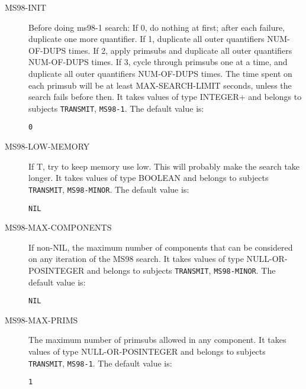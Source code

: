 \begin{description}
\item[MS98-INIT]  
Before doing ms98-1 search:
If 0, do nothing at first; after each failure, duplicate one more quantifier.
If 1, duplicate all outer quantifiers NUM-OF-DUPS times.
If 2, apply primsubs and duplicate all outer quantifiers NUM-OF-DUPS times.
If 3, cycle through primsubs one at a time, and duplicate all outer
      quantifiers NUM-OF-DUPS times. The time spent on each primsub will
      be at least MAX-SEARCH-LIMIT seconds, unless the search fails before
      then.
It takes values of type INTEGER+ and belongs to subjects \texttt{TRANSMIT}, \texttt{MS98-1}.  The default value is: \begin{lstlisting}
0
\end{lstlisting}

\item[MS98-LOW-MEMORY]  
If T, try to keep memory use low. This will probably
make the search take longer.
It takes values of type BOOLEAN and belongs to subjects \texttt{TRANSMIT}, \texttt{MS98-MINOR}.  The default value is: \begin{lstlisting}
NIL
\end{lstlisting}

\item[MS98-MAX-COMPONENTS]  
If non-NIL, the maximum number of components that can be 
considered on any iteration of the MS98 search.
It takes values of type NULL-OR-POSINTEGER and belongs to subjects \texttt{TRANSMIT}, \texttt{MS98-MINOR}.  The default value is: \begin{lstlisting}
NIL
\end{lstlisting}

\item[MS98-MAX-PRIMS]  
The maximum number of primsubs allowed in any component.
It takes values of type NULL-OR-POSINTEGER and belongs to subjects \texttt{TRANSMIT}, \texttt{MS98-1}.  The default value is: \begin{lstlisting}
1
\end{lstlisting}


\end{description}
